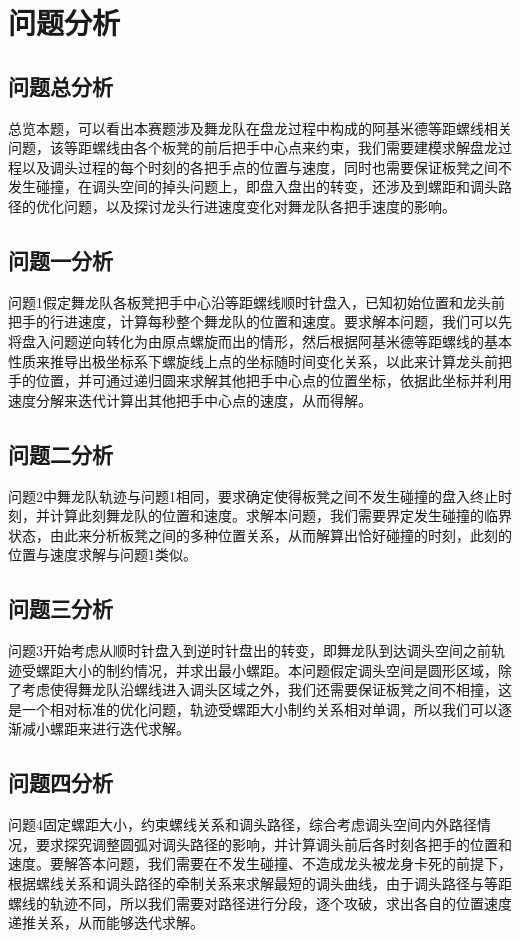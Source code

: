 \documentclass[withoutpreface,bwprint]{cumcmthesis} %
\begin{document}
\bigskip
\newpage
\section{问题分析}
\subsection{问题总分析}
总览本题，可以看出本赛题涉及舞龙队在盘龙过程中构成的阿基米德等距螺线相关问题，该等距螺线由各个板凳的前后把手中心点来约束，我们需要建模求解盘龙过程以及调头过程的每个时刻的各把手点的位置与速度，同时也需要保证板凳之间不发生碰撞，在调头空间的掉头问题上，即盘入盘出的转变，还涉及到螺距和调头路径的优化问题，以及探讨龙头行进速度变化对舞龙队各把手速度的影响。
\subsection{问题一分析}
问题1假定舞龙队各板凳把手中心沿等距螺线顺时针盘入，已知初始位置和龙头前把手的行进速度，计算每秒整个舞龙队的位置和速度。要求解本问题，我们可以先将盘入问题逆向转化为由原点螺旋而出的情形，然后根据阿基米德等距螺线的基本性质来推导出极坐标系下螺旋线上点的坐标随时间变化关系，以此来计算龙头前把手的位置，并可通过递归圆来求解其他把手中心点的位置坐标，依据此坐标并利用速度分解来迭代计算出其他把手中心点的速度，从而得解。
\subsection{问题二分析}
问题2中舞龙队轨迹与问题1相同，要求确定使得板凳之间不发生碰撞的盘入终止时刻，并计算此刻舞龙队的位置和速度。求解本问题，我们需要界定发生碰撞的临界状态，由此来分析板凳之间的多种位置关系，从而解算出恰好碰撞的时刻，此刻的位置与速度求解与问题1类似。
\subsection{问题三分析}
问题3开始考虑从顺时针盘入到逆时针盘出的转变，即舞龙队到达调头空间之前轨迹受螺距大小的制约情况，并求出最小螺距。本问题假定调头空间是圆形区域，除了考虑使得舞龙队沿螺线进入调头区域之外，我们还需要保证板凳之间不相撞，这是一个相对标准的优化问题，轨迹受螺距大小制约关系相对单调，所以我们可以逐渐减小螺距来进行迭代求解。
\subsection{问题四分析}
问题4固定螺距大小，约束螺线关系和调头路径，综合考虑调头空间内外路径情况，要求探究调整圆弧对调头路径的影响，并计算调头前后各时刻各把手的位置和速度。要解答本问题，我们需要在不发生碰撞、不造成龙头被龙身卡死的前提下，根据螺线关系和调头路径的牵制关系来求解最短的调头曲线，由于调头路径与等距螺线的轨迹不同，所以我们需要对路径进行分段，逐个攻破，求出各自的位置速度递推关系，从而能够迭代求解。
\end{document}
